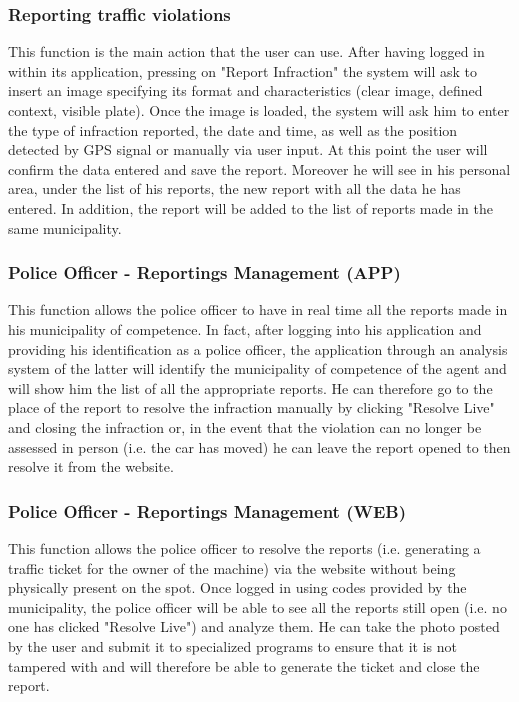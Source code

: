 \documentclass{article}
\begin{document}
    \subsubsection{Reporting traffic violations}
    This function is the main action that the user can use. After having
    logged in within its application, pressing on "Report Infraction" the system 
    will ask to insert an image specifying its format and characteristics (clear 
    image, defined context, visible plate). Once the image is loaded, the system 
    will ask him to enter the type of infraction reported, the date and time, as 
    well as the position detected by GPS signal or manually via user input. At this 
    point the user will confirm the data entered and save the report. Moreover he 
    will see in his personal area, under the list of his reports, the new report 
    with all the data he has entered. In addition, the report will be added to the 
    list of reports made in the same municipality.

    \subsubsection{Police Officer - Reportings Management (APP)}
    This function allows the police officer to have in real time all the reports 
    made in his municipality of competence. In fact, after logging into his 
    application and providing his identification as a police officer, the 
    application through an analysis system of the latter will identify the 
    municipality of competence of the agent and will show him the list of all the 
    appropriate reports. He can therefore go to the place of the report to resolve 
    the infraction manually by clicking "Resolve Live" and closing the infraction 
    or, in the event that the violation can no longer be assessed in person 
    (i.e. the car has moved) he can leave the report opened to then resolve it 
    from the website.

    \subsubsection{Police Officer - Reportings Management (WEB)}
    This function allows the police officer to resolve the reports (i.e. generating 
    a traffic ticket for the owner of the machine) via the website without being 
    physically present on the spot. Once logged in using codes provided by the 
    municipality, the police officer will be able to see all the reports still open 
    (i.e. no one has clicked "Resolve Live") and analyze them. He can take the photo 
    posted by the user and submit it to specialized programs to ensure that it is 
    not tampered with and will therefore be able to generate the ticket and close 
    the report.
\end{document}
